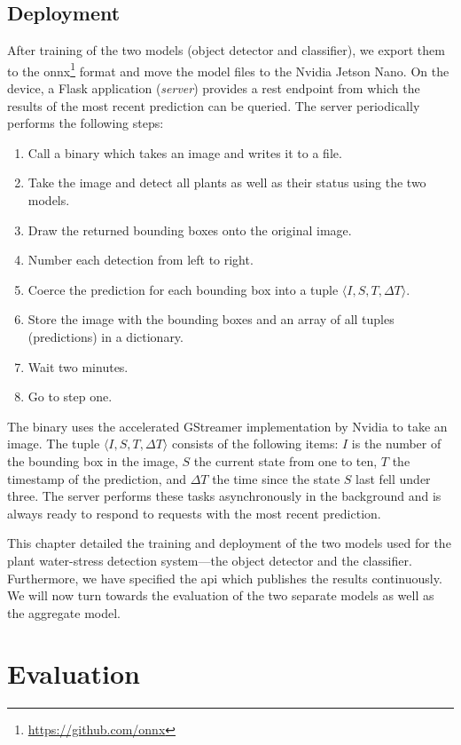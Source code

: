 \documentclass[draft,final]{vutinfth} %
\begin{document}
\section{Deployment}

After training of the two models (object detector and classifier), we
export them to the \gls{onnx}\footnote{\url{https://github.com/onnx}}
format and move the model files to the Nvidia Jetson Nano. On the
device, a Flask application (\emph{server}) provides a \gls{rest}
endpoint from which the results of the most recent prediction can be
queried. The server periodically performs the following steps:

\begin{enumerate}
\item Call a binary which takes an image and writes it to a file.
\item Take the image and detect all plants as well as their status
  using the two models.
\item Draw the returned bounding boxes onto the original image.
\item Number each detection from left to right.
\item Coerce the prediction for each bounding box into a tuple
  $\langle I, S, T,\Delta T \rangle$.
\item Store the image with the bounding boxes and an array of all
  tuples (predictions) in a dictionary.
\item Wait two minutes.
\item Go to step one.
\end{enumerate}

The binary uses the accelerated GStreamer implementation by Nvidia to
take an image. The tuple $\langle I, S, T,\Delta T \rangle$ consists of the following
items: $I$ is the number of the bounding box in the image, $S$ the
current state from one to ten, $T$ the timestamp of the prediction,
and $\Delta T$ the time since the state $S$ last fell under three. The
server performs these tasks asynchronously in the background and is
always ready to respond to requests with the most recent prediction.

This chapter detailed the training and deployment of the two models
used for the plant water-stress detection system—the object detector
and the classifier. Furthermore, we have specified the \gls{api} which
publishes the results continuously. We will now turn towards the
evaluation of the two separate models as well as the aggregate model.

\chapter{Evaluation}
\label{chap:evaluation}
\end{document}
